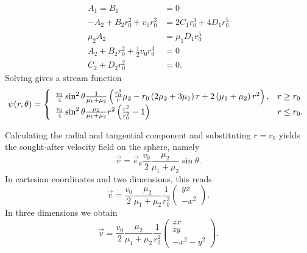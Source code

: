\begin{ex}
\begin{subequations}
\begin{align}
		A_1=B_1&=0\\
		-A_2+B_2r_0^2+v_0r_0^3&=2C_1r_0^3+4D_1r_0^5\\
		\mu_2A_2&=\mu_1D_1r_0^5\\
		A_2+B_2r_0^2+\frac{1}{2}v_0r_0^3&=0\\
		C_2+D_2r_0^2&=0.
	\end{align}
\end{subequations}
Solving  gives a stream function
\begin{equation}
	\psi\!\left(r,\theta\right)=\left\{
	\begin{array}{ll}
		\frac{v_0}{4}\sin^2\theta\frac{1}{\mu_1+\mu_2}\left(\frac{r_0^3}{r}\mu_2-r_0\left(2\mu_2+3\mu_1\right)r+2\left(\mu_1+\mu_2\right)r^2\right),&r\geq r_0\\
		\frac{v_0}{4}\sin^2\theta\frac{\mu_2}{\mu_1+\mu_2}r^2\left(\frac{r^2}{r_0^2}-1\right)&r\leq r_0.
	\end{array}
	\right.
\end{equation}
\end{ex}
Calculating the radial and tangential component and substituting $r=r_0$ yields the sought-after velocity field on the sphere, namely
\begin{equation}
	\vec v=\vec e_\theta \frac{v_0}{2}\frac{\mu_2}{\mu_1+\mu_2}\sin\theta.
\end{equation}
In cartesian coordinates and two dimensions, this reads
\begin{equation}
	\vec v=\frac{v_0}{2}\frac{\mu_2}{\mu_1+\mu_2}\frac{1}{r_0^2}\left(\!\!\begin{array}{c}yx\\-x^2\end{array}\!\!\right).
\end{equation}
In three dimensions we obtain
\begin{equation}
	\vec v=\frac{v_0}{2}\frac{\mu_2}{\mu_1+\mu_2}\frac{1}{r_0^2}\left(\!\!\begin{array}{c}zx\\zy\\-x^2-y^2\end{array}\!\!\right).
\end{equation}